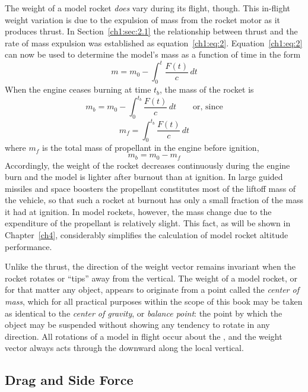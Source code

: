 The weight of a model rocket \emph{does} vary during its flight, though. This
in-flight weight variation is due to the expulsion of mass from the rocket
motor as it produces thrust. In Section~\ref{ch1:sec:2.1} the relationship
between thrust and the rate of mass expulsion was established as
equation~\eqref{ch1:eq:2}. Equation~\eqref{ch1:eq:2} can now be used to
determine the model's mass as a function of time in the form
\begin{equation}\label{ch1:eq:10}
m = m_0 - \int_{0}^{t} \frac{F(t)}{c}\,dt
\end{equation}
When the engine ceases burning at time $t_b$, the mass of the rocket is
\begin{equation}\label{ch1:eq:11}
m_b = m_0 - \int_{0}^{t_b} \frac{F(t)}{c}\,dt \qquad \text{or, since}
\end{equation}
\begin{equation}\label{ch1:eq:12}
m_f = \int_{0}^{t_b} \frac{F(t)}{c}\,dt
\end{equation}
where $m_f$ is the total mass of propellant in the engine before ignition,
\begin{equation}\label{ch1:eq:13}
m_b = m_0 - m_f
\end{equation}
Accordingly, the weight of the rocket decreases continuously during the engine
burn and the model is lighter after burnout than at ignition. In large guided
missiles and space boosters the propellant constitutes most of the liftoff mass
of the vehicle, so that such a rocket at burnout has only a small fraction of
the mass it had at ignition. In model rockets, however, the mass change due to
the expenditure of the propellant is relatively slight. This fact, as will be
shown in Chapter~\ref{ch4}, considerably simplifies the calculation of model
rocket altitude performance.

Unlike the thrust, the direction of the weight vector remains invariant when
the rocket rotates or ``tips'' away from the vertical. The weight of a model
rocket, or for that matter any object, appears to originate from a point called
the \emph{center of mass}, which for all practical purposes within the scope of
this book may be taken as identical to the \emph{center of gravity}, or
\emph{balance point}: the point by which the object may be suspended without
showing any tendency to rotate in any direction. All rotations of a model in
flight occur about the \CG, and the weight vector always acts through the \CG{}
downward along the local vertical.

\subsection{Drag and Side Force}\label{ch1:sec:2.3}

